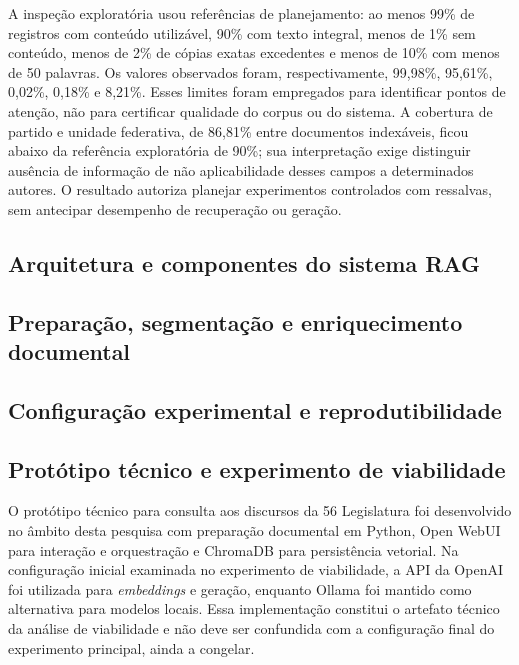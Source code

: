 A inspeção exploratória usou referências de planejamento: ao menos 99\% de registros com conteúdo utilizável, 90\% com texto integral, menos de 1\% sem conteúdo, menos de 2\% de cópias exatas excedentes e menos de 10\% com menos de 50 palavras. Os valores observados foram, respectivamente, 99,98\%, 95,61\%, 0,02\%, 0,18\% e 8,21\%. Esses limites foram empregados para identificar pontos de atenção, não para certificar qualidade do corpus ou do sistema. A cobertura de partido e unidade federativa, de 86,81\% entre documentos indexáveis, ficou abaixo da referência exploratória de 90\%; sua interpretação exige distinguir ausência de informação de não aplicabilidade desses campos a determinados autores. O resultado autoriza planejar experimentos controlados com ressalvas, sem antecipar desempenho de recuperação ou geração.

\subsection{Arquitetura e componentes do sistema RAG}


\subsection{Preparação, segmentação e enriquecimento documental}


\subsection{Configuração experimental e reprodutibilidade}


\subsection{Protótipo técnico e experimento de viabilidade}
\label{sec:viabilidade}

O protótipo técnico para consulta aos discursos da 56\textordfeminine{} Legislatura foi desenvolvido no âmbito desta pesquisa com preparação documental em Python, Open WebUI para interação e orquestração e ChromaDB para persistência vetorial. Na configuração inicial examinada no experimento de viabilidade, a API da OpenAI foi utilizada para \textit{embeddings} e geração, enquanto Ollama foi mantido como alternativa para modelos locais. Essa implementação constitui o artefato técnico da análise de viabilidade e não deve ser confundida com a configuração final do experimento principal, ainda a congelar.

